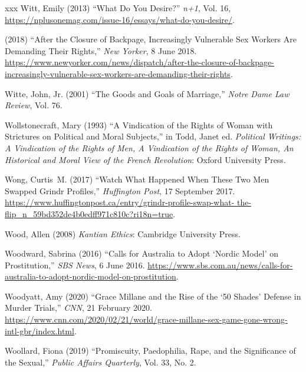 \documentclass[]{jlreq} \usepackage{mystyle}
\begin{document}
\begin{thebibliography}{xxx}
Witt, Emily (2013) ``What Do You Desire?'' \textit{ n+1}, Vol. 16,
  \url{https://nplusonemag.com/issue-16/essays/what-do-you-desire/}.

 \bysame{}  (2018) ``After the Closure of Backpage, Increasingly Vulnerable Sex
  Workers Are Demanding Their Rights,'' \emph{New Yorker}, 8 June 2018.
  \url{https://www.newyorker.com/news/dispatch/after-the-closure-of-backpage-increasingly-vulnerable-sex-workers-are-demanding-their-rights}.

Witte, John, Jr. (2001) ``The Goods and Goals of Marriage,'' \textit{ Notre
  Dame Law Review}, Vol. 76.

Wollstonecraft, Mary (1993) ``A Vindication of the Rights of Woman with
  Strictures on Political and Moral Subjects,'' in Todd, Janet ed.   \textit{
  Political Writings: A Vindication of the Rights of Men, A Vindication of the
  Rights of Woman, An Historical and Moral View of the French Revolution}:
  Oxford University Press.

Wong, Curtis~M. (2017) ``Watch What Happened When These Two Men Swapped Grindr
  Profiles,'' \emph{Huffington Post}, 17 September 2017.
  \url{https://www.huffingtonpost.ca/entry/grindr-profile-swap-what-
  the-flip_n_59bd352de4b0edff971c810c?ri18n=true}.

Wood, Allen (2008)  \textit{ Kantian Ethics}: Cambridge University Press.

Woodward, Sabrina (2016) ``Calls for Australia to Adopt `Nordic Model' on
  Prostitution,'' \emph{SBS News}, 6 June 2016.
  \url{https://www.sbs.com.au/news/calls-for-australia-to-adopt-nordic-model-on-prostitution}.

Woodyatt, Amy (2020) ``Grace Millane and the Rise of the `50 Shades' Defense in
  Murder Trials,'' \emph{CNN}, 21 February 2020.
  \url{https://www.cnn.com/2020/02/21/world/grace-millane-sex-game-gone-wrong-intl-gbr/index.html}.

Woollard, Fiona (2019) ``Promiscuity, Paedophilia, Rape, and the Significance
  of the Sexual,'' \textit{ Public Affairs Quarterly}, Vol. 33, No. 2.


\end{thebibliography}
\end{document}
